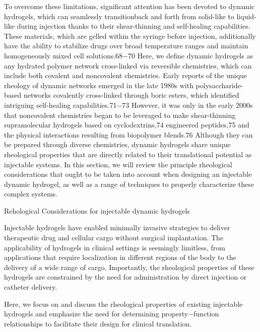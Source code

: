 \documentclass[../../main-notes.tex]{subfiles}
\begin{document}
To overcome these limitations, significant attention has been devoted to dynamic hydrogels, which can seamlessly transitionback and forth from solid-like to liquid-like during injection thanks to their shear-thinning and self-healing capabilities.  
These materials, which are gelled within the syringe before injection, additionally have the ability to stabilize drugs over broad temperature ranges and maintain homogeneously mixed  cell solutions.68−70  
Here, we define dynamic hydrogels as any hydrated polymer network cross-linked via reversible chemistries, which can include both covalent and noncovalent chemistries.  
Early reports of the unique rheology of dynamic networks emerged in the late 1980s with polysaccharide-based networks covalently cross-linked through boric esters, which  identified intriguing self-healing capabilities.71−73  
However, it was only in the early 2000s that noncovalent chemistries began to be leveraged to make shear-thinning supramolecular  hydrogels based on cyclodextrins,74 engineered peptides,75 and the physical interactions resulting from biopolymer  blends.76  
Although they can be prepared through diverse chemistries, dynamic hydrogels share unique rheological properties that are directly related to their translational potential as injectable systems.  
In this section, we will review the principle rheological considerations that ought to be taken into account when designing an injectable dynamic hydrogel, as well as a range of techniques to properly characterize these complex systems.


Rehological Considerations for injectable dynamic hydrogels 

Injectable hydrogels have enabled minimally invasive strategies to deliver therapeutic drug and cellular cargo without surgical implantation.  
The applicability of hydrogels in clinical settings is seemingly limitless, from applications that require localization in different regions of the body to the delivery of a wide range of cargo.  
Importantly, the rheological properties of these hydrogels are constrained by the need for administration by direct injection or catheter delivery.   

Here, we focus on and discuss the rheological properties of existing injectable hydrogels and emphasize the need for determining property−function relationships to facilitate their design for clinical translation.   
\end{document}
